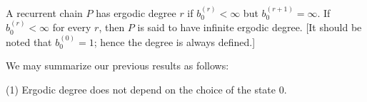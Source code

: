 A recurrent chain $P$ has ergodic degree $r$ if $b_0^{(r)} < \infty$ but $b_0^{(r+1)} = \infty$. If $b_0^{(r)} < \infty$ for every $r$, then $P$ is said to have infinite ergodic degree. [It should be noted that $b_0^{(0)} = 1$; hence the degree is always defined.]

We may summarize our previous results as follows:

(1) Ergodic degree does not depend on the choice of the state 0.
